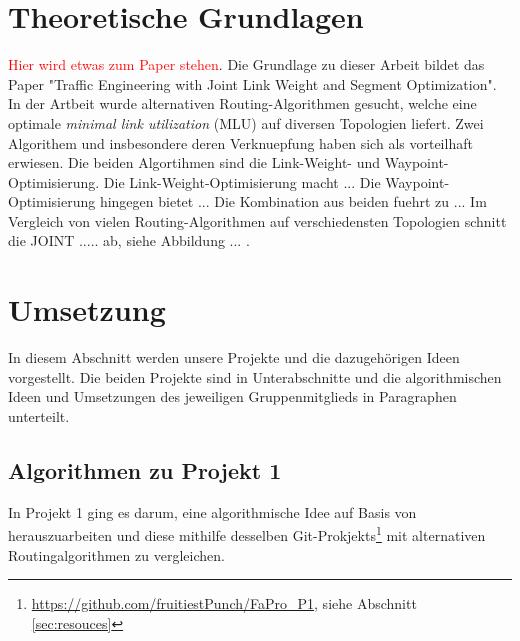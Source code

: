 \documentclass[sigconf, nonacm, review]{acmart}
\begin{document}
\section{Theoretische Grundlagen}
\textcolor{red}{Hier wird etwas zum Paper stehen}\cite{foerster2021}.
Die Grundlage zu dieser Arbeit bildet das Paper "Traffic Engineering with Joint Link Weight and Segment Optimization"\cite{foerster2021}.
In der Artbeit wurde alternativen Routing-Algorithmen gesucht, 
welche eine optimale \emph{minimal link utilization} (MLU) auf diversen Topologien liefert. 
Zwei Algorithem und insbesondere deren Verknuepfung haben sich als vorteilhaft erwiesen.
Die beiden Algortihmen sind die Link-Weight- und Waypoint-Optimisierung.
Die Link-Weight-Optimisierung macht ...\newline
Die Waypoint-Optimisierung hingegen bietet ...\newline
Die Kombination aus beiden fuehrt zu ...\newline
Im Vergleich von vielen Routing-Algorithmen auf verschiedensten Topologien schnitt die JOINT ..... ab, siehe Abbildung ...    .

\section{Umsetzung}
In diesem Abschnitt werden unsere Projekte und die dazugeh\"origen Ideen vorgestellt.
Die beiden Projekte sind in Unterabschnitte und die algorithmischen Ideen und Umsetzungen des jeweiligen Gruppenmitglieds in Paragraphen unterteilt. 
\subsection{Algorithmen zu Projekt 1}
In Projekt 1 ging es darum, eine algorithmische Idee auf Basis von \cite{foerster2021} herauszuarbeiten und diese mithilfe desselben Git-Prokjekts\footnote{\url{https://github.com/fruitiestPunch/FaPro_P1}, siehe Abschnitt \ref{sec:resouces}} mit alternativen Routingalgorithmen zu vergleichen. 
\end{document}
